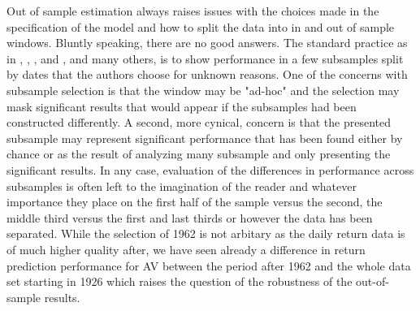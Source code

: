 Out of sample estimation always raises issues with the choices made in the specification of the model and how to split the data into in and out of sample windows. 
Bluntly speaking, there are no good answers. The standard practice as in \citet{Rapach2013}, \citet{Rapach2010}, \citet{Rapach2016}, and \cite{Huang2015}, and many others, is to show performance in a few subsamples split by dates that the authors choose for unknown reasons. One of the concerns with subsample selection is that the window may be "ad-hoc" and the selection may mask significant results that would appear if the subsamples had been constructed differently. A second, more cynical, concern is that the presented subsample may represent significant performance that has been found either by chance or as the result of analyzing many subsample and only presenting the significant results. In any case, evaluation of the differences in performance across subsamples is often left to the imagination of the reader and whatever importance they place on the first half of the sample versus the second, the middle third versus the first and last thirds or however the data has been separated. While the selection of 1962 is not arbitary as the daily return data is of much higher quality after, we have seen already a difference in return prediction performance for AV between the period after 1962 and the whole data set starting in 1926 which raises the question of the robustness of the out-of-sample results. 

